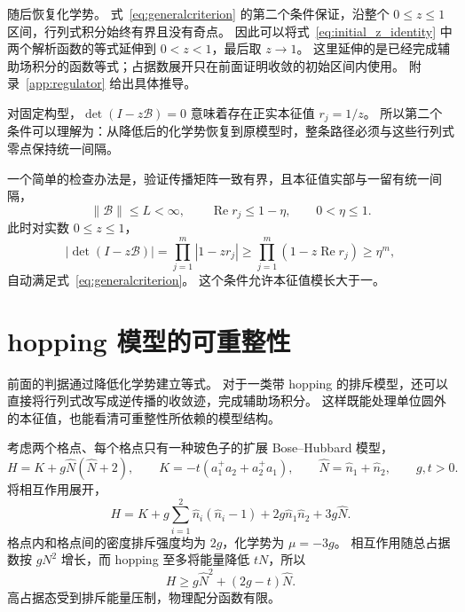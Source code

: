 \documentclass[UTF8,11pt,a4paper,fontset=fandol]{ctexart}
\numberwithin{equation}{section}
\begin{document}
随后恢复化学势。
式~\eqref{eq:generalcriterion} 的第二个条件保证，沿整个 $0\le z\le1$ 区间，行列式积分始终有界且没有奇点。
因此可以将式~\eqref{eq:initial_z_identity} 中两个解析函数的等式延伸到 $0<z<1$，最后取 $z\to1$。
这里延伸的是已经完成辅助场积分的函数等式；占据数展开只在前面证明收敛的初始区间内使用。
附录~\ref{app:regulator} 给出具体推导。

对固定构型，$\det(I-z\mathcal B)=0$ 意味着存在正实本征值 $r_j=1/z$。
所以第二个条件可以理解为：从降低后的化学势恢复到原模型时，整条路径必须与这些行列式零点保持统一间隔。

一个简单的检查办法是，验证传播矩阵一致有界，且本征值实部与一留有统一间隔，
\begin{equation}
 \|\mathcal B\|\le L<\infty,\qquad
 \operatorname{Re}r_j\le1-\eta,\qquad 0<\eta\le1.
 \label{eq:realpartcriterion}
\end{equation}
此时对实数 $0\le z\le1$，
\begin{equation}
 |\det(I-z\mathcal B)|
 =\prod_{j=1}^{m}|1-zr_j|
 \ge\prod_{j=1}^{m}(1-z\operatorname{Re}r_j)
 \ge\eta^m,
\end{equation}
自动满足式~\eqref{eq:generalcriterion}。
这个条件允许本征值模长大于一。

\section{hopping 模型的可重整性}
\label{sec:charging_model}

前面的判据通过降低化学势建立等式。
对于一类带 hopping 的排斥模型，还可以直接将行列式改写成逆传播的收敛迹，完成辅助场积分。
这样既能处理单位圆外的本征值，也能看清可重整性所依赖的模型结构。

考虑两个格点、每个格点只有一种玻色子的扩展 Bose--Hubbard 模型，
\begin{equation}
 H=K+g\hat N(\hat N+2),\qquad
 K=-t(a_1^+a_2+a_2^+a_1),\qquad
 \hat N=\hat n_1+\hat n_2,\qquad g,t>0.
 \label{eq:charging_dimer}
\end{equation}
将相互作用展开，
\begin{equation}
 H=K+g\sum_{i=1}^2\hat n_i(\hat n_i-1)
       +2g\hat n_1\hat n_2+3g\hat N.
\end{equation}
格点内和格点间的密度排斥强度均为 $2g$，化学势为 $\mu=-3g$。
相互作用随总占据数按 $gN^2$ 增长，而 hopping 至多将能量降低 $tN$，所以
\begin{equation}
 H\ge g\hat N^2+(2g-t)\hat N.
\end{equation}
高占据态受到排斥能量压制，物理配分函数有限。
\end{document}

